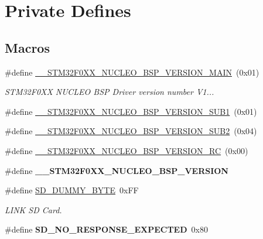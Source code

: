 \hypertarget{group___s_t_m32_f0_x_x___n_u_c_l_e_o___private___defines}{}\section{Private Defines}
\label{group___s_t_m32_f0_x_x___n_u_c_l_e_o___private___defines}
\subsection*{Macros}
\begin{DoxyCompactItemize}
\item 
\#define \hyperlink{group___s_t_m32_f0_x_x___n_u_c_l_e_o___private___defines_gacd2501481848d91443c76d7e78c28149}{\+\_\+\+\_\+\+S\+T\+M32\+F0\+X\+X\+\_\+\+N\+U\+C\+L\+E\+O\+\_\+\+B\+S\+P\+\_\+\+V\+E\+R\+S\+I\+O\+N\+\_\+\+M\+A\+IN}~(0x01)
\begin{DoxyCompactList}\small\item\em S\+T\+M32\+F0\+XX N\+U\+C\+L\+EO B\+SP Driver version number V1... \end{DoxyCompactList}\item 
\#define \hyperlink{group___s_t_m32_f0_x_x___n_u_c_l_e_o___private___defines_ga6509df5e5a6bd37b299fb770c9b3baf7}{\+\_\+\+\_\+\+S\+T\+M32\+F0\+X\+X\+\_\+\+N\+U\+C\+L\+E\+O\+\_\+\+B\+S\+P\+\_\+\+V\+E\+R\+S\+I\+O\+N\+\_\+\+S\+U\+B1}~(0x01)
\item 
\#define \hyperlink{group___s_t_m32_f0_x_x___n_u_c_l_e_o___private___defines_ga965dc89ba215213427a10f04814ca895}{\+\_\+\+\_\+\+S\+T\+M32\+F0\+X\+X\+\_\+\+N\+U\+C\+L\+E\+O\+\_\+\+B\+S\+P\+\_\+\+V\+E\+R\+S\+I\+O\+N\+\_\+\+S\+U\+B2}~(0x04)
\item 
\#define \hyperlink{group___s_t_m32_f0_x_x___n_u_c_l_e_o___private___defines_ga9989fc656510e0bedf080181fe11b5a1}{\+\_\+\+\_\+\+S\+T\+M32\+F0\+X\+X\+\_\+\+N\+U\+C\+L\+E\+O\+\_\+\+B\+S\+P\+\_\+\+V\+E\+R\+S\+I\+O\+N\+\_\+\+RC}~(0x00)
\item 
\#define {\bfseries \+\_\+\+\_\+\+S\+T\+M32\+F0\+X\+X\+\_\+\+N\+U\+C\+L\+E\+O\+\_\+\+B\+S\+P\+\_\+\+V\+E\+R\+S\+I\+ON}
\item 
\mbox{\label{group___s_t_m32_f0_x_x___n_u_c_l_e_o___private___defines_ga799a94721d29661d31a1b2a3c5bd0f40}} 
\#define \hyperlink{group___s_t_m32_f0_x_x___n_u_c_l_e_o___private___defines_ga799a94721d29661d31a1b2a3c5bd0f40}{S\+D\+\_\+\+D\+U\+M\+M\+Y\+\_\+\+B\+Y\+TE}~0x\+FF
\begin{DoxyCompactList}\small\item\em L\+I\+NK SD Card. \end{DoxyCompactList}\item 
\mbox{\label{group___s_t_m32_f0_x_x___n_u_c_l_e_o___private___defines_ga1f88682da2fa2310b795549e9d56106b}} 
\#define {\bfseries S\+D\+\_\+\+N\+O\+\_\+\+R\+E\+S\+P\+O\+N\+S\+E\+\_\+\+E\+X\+P\+E\+C\+T\+ED}~0x80
\end{DoxyCompactItemize}


